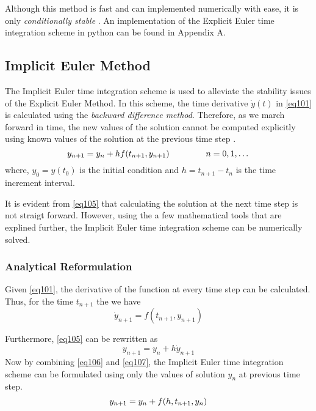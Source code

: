 Although this method is fast and can implemented numerically with ease, it is only \textit{conditionally stable} \cite[see][]{Fuhrer2001}. An implementation of the Explicit Euler time integration scheme in python can be found in Appendix A.

\subsection{Implicit Euler Method}\label{sec:implicitEuler}
The Implicit Euler time integration scheme is used to alleviate the stability issues of the Explicit Euler Method. In this scheme, the time derivative $\dot{y}(t)$ in \cref{eq101} is calculated using the \textit{backward difference method}. Therefore, as we march forward in time, the new values of the solution cannot be computed explicitly using known values of the solution at the previous time step \parencite[see][pg. 105]{Fuhrer2001}.
\begin{equation}
\label{eq105}
y_{n+1} = y_n + h f(t_{n+1}, y_{n+1}) \text{\hspace{15mm}} n = 0,1,\ldots\\ 
\end{equation}
where, $y_0 = y(t_0)$ is the initial condition and $h = t_{n+1} - t_n$ is the time increment interval.

It is evident from \cref{eq105} that calculating the solution at the next time step is not straigt forward. However, using the a few mathematical tools that are explined further, the Implicit Euler time integration scheme can be numerically solved.

\subsubsection{Analytical Reformulation}
Given \cref{eq101}, the derivative of the function at every time step can be calculated. Thus, for the time $t_{n+1}$ the we have
\begin{equation}
\dot{y}_{n+1} = f(t_{n+1}, y_{n+1})
\label{eq106}
\end{equation}

Furthermore, \cref{eq105} can be rewritten as 
\begin{equation}
\label{eq107}
y_{n+1} = y_n + h {\dot{y}_{n+1}}
\end{equation}
Now by combining \cref{eq106} and \cref{eq107}, the Implicit Euler time integration scheme can be formulated using only the values of solution ${y_n}$ at previous time step. \parencite[see][]{andasarihandout}
\begin{equation}
\label{eq108}
y_{n+1} = y_n + f(h, t_{n+1}, y_{n}) \\
\end{equation}

